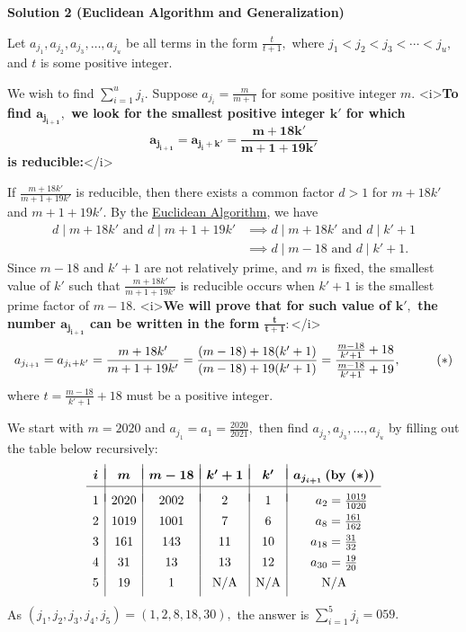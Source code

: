 \begin{enumerate}
\textbf{Solution 2 (Euclidean Algorithm and Generalization)}

Let $a_{j_1}, a_{j_2}, a_{j_3}, \ldots, a_{j_u}$ be all terms in the form $\frac{t}{t+1},$ where $j_1<j_2<j_3<\cdots<j_u,$ and $t$ is some positive integer.

 We wish to find $\sum_{i=1}^{u}{j_i}.$ Suppose $a_{j_i}=\frac{m}{m+1}$ for some positive integer $m.$
<i>\textbf{To find $\boldsymbol{a_{j_{i+1}},}$ we look for the smallest positive integer $\boldsymbol{k'}$ for which 
 \[\boldsymbol{a_{j_{i+1}}=a_{j_i+k'}=\frac{m+18k'}{m+1+19k'}}\] is reducible:}</i>

 If $\frac{m+18k'}{m+1+19k'}$ is reducible, then there exists a common factor $d>1$ for $m+18k'$ and $m+1+19k'.$ By the \href{https://artofproblemsolving.com/wiki/index.php?title=Euclidean\_algorithm}{Euclidean Algorithm}, we have
 \begin{align*} d\mid m+18k' \text{ and } d\mid m+1+19k' &\implies d\mid m+18k' \text{ and } d\mid k'+1 \\ &\implies d\mid m-18 \text{ and } d\mid k'+1. \end{align*}
Since $m-18$ and $k'+1$ are not relatively prime, and $m$ is fixed, the smallest value of $k'$ such that $\frac{m+18k'}{m+1+19k'}$ is reducible occurs when $k'+1$ is the smallest prime factor of $m-18.$
<i>\textbf{We will prove that for such value of $\boldsymbol{k',}$ the number $\boldsymbol{a_{j_{i+1}}}$ can be written in the form $\boldsymbol{\frac{t}{t+1}:}$}</i> 
 \[a_{j_{i+1}}=a_{j_i+k'}=\frac{m+18k'}{m+1+19k'}=\frac{(m-18)+18(k'+1)}{(m-18)+19(k'+1)}=\frac{\frac{m-18}{k'+1}+18}{\frac{m-18}{k'+1}+19}, \hspace{10mm} (*)\] where $t=\frac{m-18}{k'+1}+18$ must be a positive integer.

 We start with $m=2020$ and $a_{j_1}=a_1=\frac{2020}{2021},$ then find $a_{j_2}, a_{j_3}, \ldots, a_{j_u}$ by filling out the table below recursively:
 \[\begin{array}{c|c|c|c|c|c}  & & & & & \\ [-2ex] \boldsymbol{i} & \boldsymbol{m} & \boldsymbol{m-18} & \boldsymbol{k'+1} & \boldsymbol{k'} & \boldsymbol{a_{j_{i+1}} \left(\textbf{by } (*)\right)} \\ [0.5ex]  \hline   & & & & & \\ [-1.5ex]  1 & 2020 & 2002 & 2 & 1 & \hspace{4.25mm} a_2 = \frac{1019}{1020} \\ [1ex]      2 & 1019 & 1001 & 7 & 6 & \hspace{2.75mm} a_8 = \frac{161}{162} \\ [1ex]     3 & 161 & 143 & 11 & 10 & a_{18} = \frac{31}{32} \\ [1ex] 4 & 31 & 13 & 13 & 12 & a_{30} = \frac{19}{20} \\ [1ex] 5 & 19 & 1 & \text{N/A} & \text{N/A} & \text{N/A} \\ [1ex] \end{array}\]As $\left(j_1,j_2,j_3,j_4,j_5\right)=(1,2,8,18,30),$ the answer is $\sum_{i=1}^{5}{j_i}=\boxed{059}.$


\end{enumerate}
